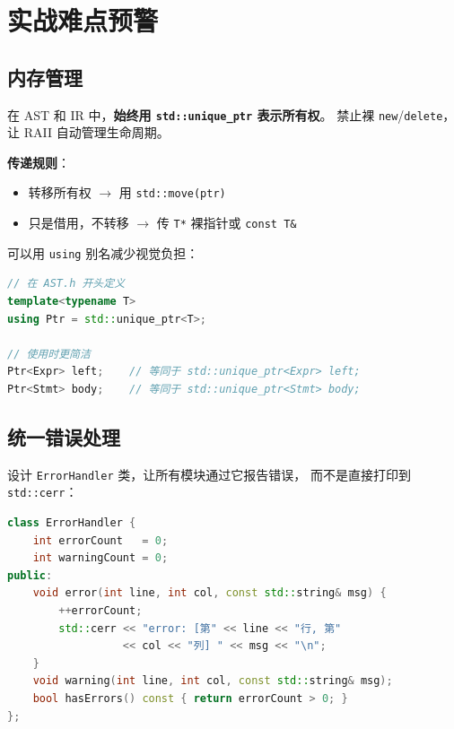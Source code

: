 \documentclass[12pt, a4paper]{ctexart}
\begin{document}
\section{实战难点预警}

\subsection{内存管理}

\begin{keybox}
在 AST 和 IR 中，\textbf{始终用 \texttt{std::unique\_ptr} 表示所有权}。
禁止裸 \texttt{new}/\texttt{delete}，让 RAII 自动管理生命周期。

\textbf{传递规则}：
\begin{itemize}[noitemsep]
  \item 转移所有权 $\to$ 用 \texttt{std::move(ptr)}
  \item 只是借用，不转移 $\to$ 传 \texttt{T*} 裸指针或 \texttt{const T\&}
\end{itemize}
\end{keybox}

可以用 \texttt{using} 别名减少视觉负担：

\begin{lstlisting}[language=C++, caption={用 using 简化智能指针书写}]
// 在 AST.h 开头定义
template<typename T>
using Ptr = std::unique_ptr<T>;

// 使用时更简洁
Ptr<Expr> left;    // 等同于 std::unique_ptr<Expr> left;
Ptr<Stmt> body;    // 等同于 std::unique_ptr<Stmt> body;
\end{lstlisting}

\subsection{统一错误处理}

设计 \texttt{ErrorHandler} 类，让所有模块通过它报告错误，
而不是直接打印到 \texttt{std::cerr}：

\begin{lstlisting}[language=C++, caption={ErrorHandler 设计思路}]
class ErrorHandler {
    int errorCount   = 0;
    int warningCount = 0;
public:
    void error(int line, int col, const std::string& msg) {
        ++errorCount;
        std::cerr << "error: [第" << line << "行, 第"
                  << col << "列] " << msg << "\n";
    }
    void warning(int line, int col, const std::string& msg);
    bool hasErrors() const { return errorCount > 0; }
};
\end{lstlisting}
\end{document}
